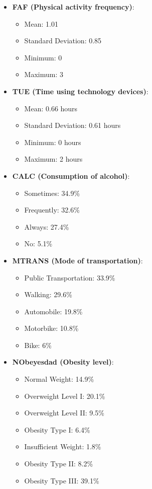 \documentclass[conference]{IEEEtran}
\begin{document}
\begin{itemize}
    \item \textbf{FAF (Physical activity frequency)}:
    \begin{itemize}
        \item Mean: 1.01
        \item Standard Deviation: 0.85
        \item Minimum: 0
        \item Maximum: 3
    \end{itemize}
    
    \item \textbf{TUE (Time using technology devices)}:
    \begin{itemize}
        \item Mean: 0.66 hours
        \item Standard Deviation: 0.61 hours
        \item Minimum: 0 hours
        \item Maximum: 2 hours
    \end{itemize}
    
    \item \textbf{CALC (Consumption of alcohol)}:
    \begin{itemize}
        \item Sometimes: 34.9\%
        \item Frequently: 32.6\%
        \item Always: 27.4\%
        \item No: 5.1\%
    \end{itemize}
    
    \item \textbf{MTRANS (Mode of transportation)}:
    \begin{itemize}
        \item Public Transportation: 33.9\%
        \item Walking: 29.6\%
        \item Automobile: 19.8\%
        \item Motorbike: 10.8\%
        \item Bike: 6\%
    \end{itemize}
    
    \item \textbf{NObeyesdad (Obesity level)}:
    \begin{itemize}
        \item Normal Weight: 14.9\%
        \item Overweight Level I: 20.1\%
        \item Overweight Level II: 9.5\%
        \item Obesity Type I: 6.4\%
        \item Insufficient Weight: 1.8\%
        \item Obesity Type II: 8.2\%
        \item Obesity Type III: 39.1\%
    \end{itemize}
\end{itemize}
\end{document}
